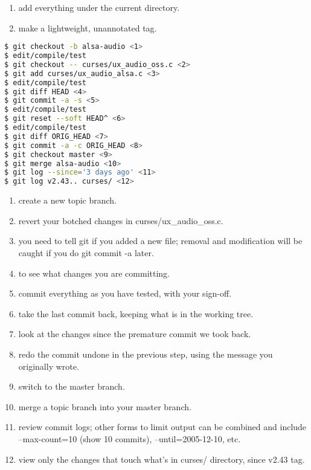 \begin{enumerate}
\setlength{\itemsep}{0cm}
\setlength{\parskip}{0cm}
\item add everything under the current directory.
\item make a lightweight, unannotated tag.
\end{enumerate}

\lstset{basicstyle=\scriptsize, numbers=none, captionpos=b, tabsize=4}
\begin{lstlisting}[caption=Create a topic branch and develop,language={bash},
breaklines=true,label=lst:createatopicbranchanddevelop]
$ git checkout -b alsa-audio <1>
$ edit/compile/test
$ git checkout -- curses/ux_audio_oss.c <2>
$ git add curses/ux_audio_alsa.c <3>
$ edit/compile/test
$ git diff HEAD <4>
$ git commit -a -s <5>
$ edit/compile/test
$ git reset --soft HEAD^ <6>
$ edit/compile/test
$ git diff ORIG_HEAD <7>
$ git commit -a -c ORIG_HEAD <8>
$ git checkout master <9>
$ git merge alsa-audio <10>
$ git log --since='3 days ago' <11>
$ git log v2.43.. curses/ <12>
\end{lstlisting}

\begin{enumerate}
\setlength{\itemsep}{0cm}
\setlength{\parskip}{0cm}
\item create a new topic branch.
\item revert your botched changes in curses/ux\_audio\_oss.c.
\item you need to tell git if you added a new file; removal and modification
will be caught if you do git commit -a later.
\item to see what changes you are committing.
\item commit everything as you have tested, with your sign-off.
\item take the last commit back, keeping what is in the working tree.
\item look at the changes since the premature commit we took back.
\item redo the commit undone in the previous step, using the message you
originally wrote.
\item switch to the master branch.
\item merge a topic branch into your master branch.
\item review commit logs; other forms to limit output can be combined and
include --max-count=10 (show 10 commits), --until=2005-12-10, etc.
\item view only the changes that touch what’s in curses/ directory, since v2.43
tag.
\end{enumerate}

